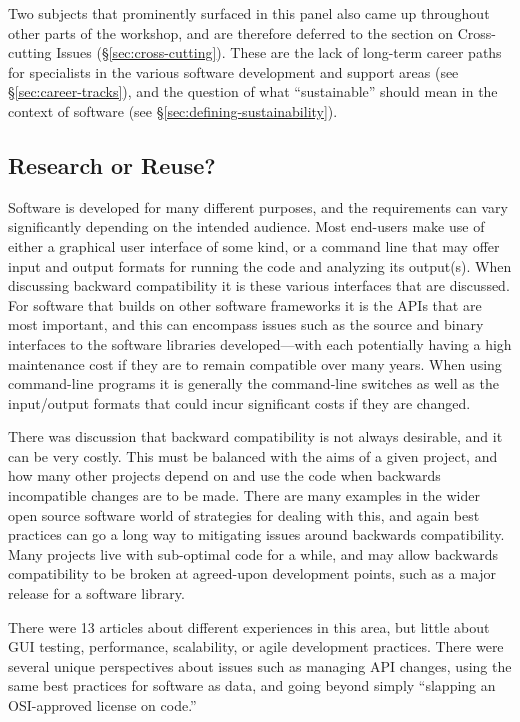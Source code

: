 \documentclass[11pt, oneside]{amsart}
\begin{document}
Two subjects that prominently surfaced in this panel also came up
throughout other parts of the workshop, and are therefore deferred to
the section on Cross-cutting Issues (\S\ref{sec:cross-cutting}). These
are the lack of long-term career paths for specialists in the various
software development and support areas (see
\S\ref{sec:career-tracks}), and the question of what ``sustainable''
should mean in the context of software (see
\S\ref{sec:defining-sustainability}).

\subsection{Research or Reuse?}

Software is developed for many different purposes, and the
requirements can vary significantly depending on the intended
audience. Most end-users make use of either a graphical user interface
of some kind, or a command line that may offer input and output
formats for running the code and analyzing its output(s). When
discussing backward compatibility it is these various interfaces that
are discussed. For software that builds on other software frameworks
it is the APIs that are most important, and this can encompass issues
such as the source and binary interfaces to the software libraries
developed---with each potentially having a high maintenance cost if
they are to remain compatible over many years. When using command-line
programs it is generally the command-line switches as well as the
input/output formats that could incur significant costs if they are
changed.

There was discussion that backward compatibility is not always
desirable, and it can be very costly. This must be balanced with the
aims of a given project, and how many other projects depend on and use
the code when backwards incompatible changes are to be made. There are
many examples in the wider open source software world of strategies
for dealing with this, and again best practices can go a long way to
mitigating issues around backwards compatibility. Many projects live
with sub-optimal code for a while, and may allow backwards
compatibility to be broken at agreed-upon development points, such as
a major release for a software library.

There were 13 articles about different experiences in this area, but
little about GUI testing, performance, scalability, or agile
development practices. There were several unique perspectives about
issues such as managing API changes, using the same best practices for
software as data, and going beyond simply ``slapping an OSI-approved
license on code.''
\end{document}

